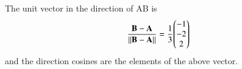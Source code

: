 The unit vector  in the direction of AB is 
\begin{align}
	\frac{\mathbf{B}-\mathbf{A}}{\left\lVert\mathbf{B}-\mathbf{A}\right\rVert}
	= \frac{1}{3}{\begin{pmatrix}-1\\-2\\2\end{pmatrix}}
\end{align}
and the direction cosines are the elements of the above vector.
